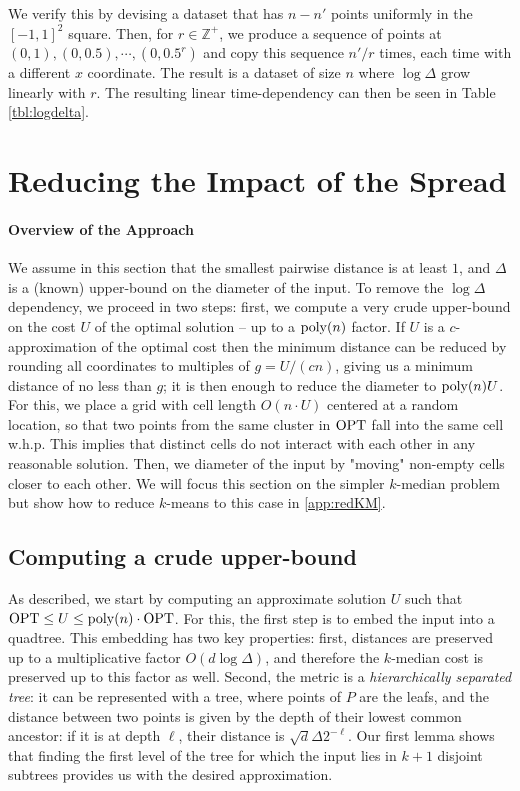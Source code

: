 We verify this by devising a dataset that has $n - n'$ points uniformly in the $[-1, 1]^2$ square. Then, for $r \in \mathbb{Z}^+$, we produce a sequence of
points at $(0, 1), (0, 0.5), \cdots, (0, 0.5^r)$ and copy this sequence $n' / r$ times, each time with a different $x$ coordinate. The result is a dataset of
size $n$ where $\log \Delta$ grow linearly with $r$. The resulting linear time-dependency can then be seen in Table \ref{tbl:logdelta}.



\section{Reducing the Impact of the Spread}
\label{sec:theory} %
\newcommand{\boxsize}{\textsc{MaxDist}}

\paragraph*{Overview of the Approach}
We assume in this section that the smallest pairwise distance is at least $1$, and $\Delta$ is a (known) upper-bound on the diameter of the input.
To remove the $\log\Delta$ dependency, we proceed in two steps: first, we compute a very crude upper-bound on the cost $U$ of the optimal solution -- up to
a $\operatorname{poly}(n)$ factor.  If $U$ is a $c$-approximation of the optimal cost then the minimum distance can be reduced by rounding all coordinates to multiples of $g
= U/(cn)$, giving us a minimum distance of no less than $g$; it is then enough to reduce the diameter to $\operatorname{poly}(n) U$.  For this, we place a grid with cell length
$O(n \cdot U)$ centered at a random location, so that two points from the same cluster in $\text{OPT}$ fall into the same cell w.h.p. This implies that distinct cells do not interact with each other
in any reasonable solution.  Then, we diameter of the input by "moving" non-empty cells closer to each other. We will focus this section on the simpler $k$-median
problem but show how to reduce $k$-means to this case in \cref{app:redKM}.


\subsection{Computing a crude upper-bound}
\label{ssec:crude_bound}

As described, we start by computing an approximate solution $U$ such that $\text{OPT} \leq U \leq \operatorname{poly}(n) \cdot \text{OPT}$. For this, the first step is to embed the input
into a quadtree. This embedding has two key properties: first, distances are preserved up to a multiplicative factor $O(d \log \Delta)$, and therefore the $k$-median cost is preserved up to this factor as well. Second, the metric is a \emph{hierarchically separated tree}: it can be represented with a tree, where points of $P$ are the leafs, and the distance between two points is given by the depth of their lowest common ancestor: if it is at depth $\ell$, their distance is $\sqrt{d} \Delta 2^{-\ell}$. 
 Our first lemma shows
that finding the first level of the tree for which the input lies in $k+1$ disjoint subtrees provides us with the desired approximation. 

